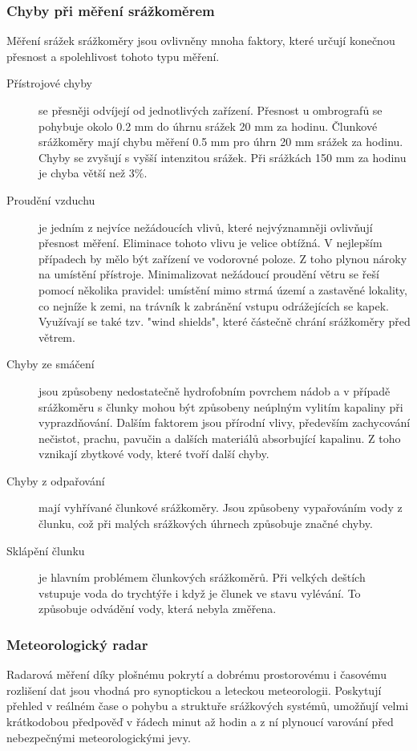 \documentclass[a4paper,12pt]{article}
\begin{document}
\subsubsection*{Chyby při měření srážkoměrem} 
Měření srážek srážkoměry jsou ovlivněny mnoha faktory, které určují konečnou přesnost a spolehlivost tohoto typu měření.
\begin{description} 
\item[Přístrojové chyby] se přesněji odvíjejí od jednotlivých zařízení. Přesnost u ombrografů se pohybuje okolo 0.2 mm do úhrnu srážek 20 mm za hodinu. Člunkové srážkoměry mají chybu měření 0.5 mm pro úhrn 20 mm srážek za hodinu. Chyby se zvyšují s vyšší intenzitou srážek. Při srážkách 150 mm za hodinu je chyba větší než 3\%. \cite{wmo}
\item[Proudění vzduchu] je jedním z nejvíce nežádoucích vlivů, které nejvýznamněji ovlivňují přesnost měření. Eliminace tohoto vlivu je velice obtížná. V nejlepším případech by mělo být zařízení ve vodorovné poloze. Z toho plynou nároky na umístění přístroje. Minimalizovat nežádoucí proudění větru se řeší pomocí několika pravidel: umístění mimo strmá území a zastavěné lokality, co nejníže k zemi, na trávník k zabránění vstupu odrážejících se kapek. Využívají se také tzv. "wind shields", které částečně chrání srážkoměry před větrem.
\item[Chyby ze smáčení] jsou způsobeny nedostatečně hydrofobním povrchem nádob a v případě srážkoměru s člunky mohou být způsobeny neúplným vylitím kapaliny při vyprazdňování. Dalším faktorem jsou přírodní vlivy, především zachycování nečistot, prachu, pavučin a dalších materiálů absorbující kapalinu. Z toho vznikají zbytkové vody, které tvoří další chyby. 
\item[Chyby z odpařování] mají vyhřívané člunkové srážkoměry. Jsou způsobeny vypařováním vody z člunku, což při malých srážkových úhrnech způsobuje značné chyby.
\item[Sklápění člunku] je hlavním problémem člunkových srážkoměrů. Při velkých deštích vstupuje voda do trychtýře i když je člunek ve stavu vylévání. To způsobuje odvádění vody, která nebyla změřena. 

\end{description}

\subsubsection{Meteorologický radar}
Radarová měření díky plošnému pokrytí a dobrému prostorovému i časovému rozlišení dat jsou vhodná pro synoptickou a leteckou meteorologii. Poskytují přehled v reálném čase o pohybu a struktuře srážkových systémů, umožňují velmi krátkodobou předpověď v řádech minut až hodin a z ní plynoucí varování před nebezpečnými meteorologickými jevy.\cite{radar_chmu}
\end{document}
